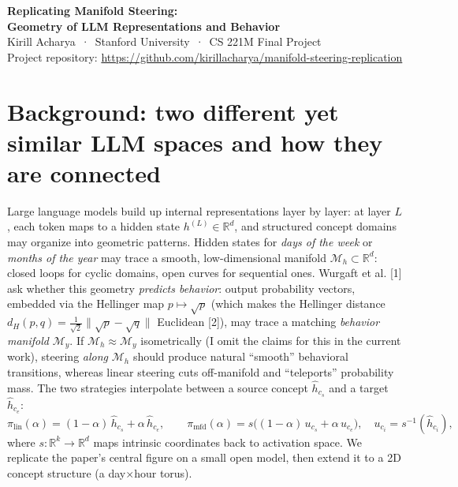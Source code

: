 \documentclass[10pt]{article}
\newcommand{\repourl}{https://github.com/kirillacharya/manifold-steering-replication}
\begin{document}
\begin{center}
  {\LARGE\bfseries Replicating Manifold Steering:\\[2pt]
   Geometry of LLM Representations and Behavior}\\[5pt]
  {\normalsize Kirill Acharya \,·\, Stanford University \,·\, CS 221M Final Project}\\[2pt]
  {\small Project repository: \;\url{\repourl}}
\end{center}

\section{Background: two different yet similar LLM spaces and how they are connected}

Large language models build up internal representations layer by layer: at
layer $L$, each token maps to a hidden state $h^{(L)}\in\mathbb{R}^d$, and
structured concept domains may organize into geometric patterns. Hidden
states for \emph{days of the week} or \emph{months of the year} may trace a
smooth, low-dimensional manifold $\mathcal{M}_h\subset\mathbb{R}^d$:
closed loops for cyclic domains, open curves for sequential ones. Wurgaft et
al. [1] ask whether this geometry \emph{predicts
behavior}: output probability vectors, embedded via the Hellinger map
$p\mapsto\sqrt{p}$ (which makes the Hellinger distance
$d_H(p,q)=\tfrac{1}{\sqrt 2}\lVert\sqrt p-\sqrt q\rVert$ Euclidean
[2]), may trace a matching \emph{behavior manifold}
$\mathcal{M}_y$. If $\mathcal{M}_h\approx\mathcal{M}_y$ isometrically (I omit the claims for this in the current work),
steering \emph{along} $\mathcal{M}_h$ should produce natural ``smooth'' behavioral
transitions, whereas linear steering cuts off-manifold and ``teleports''
probability mass. The two strategies interpolate between a source concept
$\hat h_{c_s}$ and a target $\hat h_{c_e}$:
\[
  \pi_{\mathrm{lin}}(\alpha) = (1-\alpha)\,\hat h_{c_s} + \alpha\,\hat h_{c_e},
  \qquad
  \pi_{\mathrm{mfd}}(\alpha) = s\!\big((1-\alpha)\,u_{c_s} + \alpha\,u_{c_e}\big),
  \quad u_{c_i} = s^{-1}(\hat h_{c_i}),
\]
where $s:\mathbb{R}^k\to\mathbb{R}^d$ maps intrinsic coordinates back to
activation space. We replicate the paper's central figure on a small open
model, then extend it to a 2D concept structure (a day$\times$hour torus).
\end{document}

